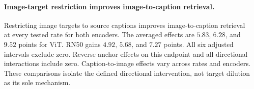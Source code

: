 \paragraph{Image-target restriction improves image-to-caption retrieval.}
Restricting image targets to source captions improves image-to-caption retrieval at every tested rate for both encoders.
The averaged effects are $5.83$, $6.28$, and $9.52$ points for ViT.
RN50 gains $4.92$, $5.68$, and $7.27$ points.
All six adjusted intervals exclude zero.
Reverse-anchor effects on this endpoint and all directional interactions include zero.
Caption-to-image effects vary across rates and encoders.
These comparisons isolate the defined directional intervention, not target dilution as its sole mechanism.
